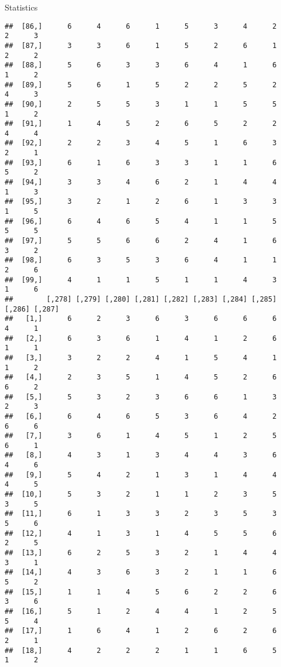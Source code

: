 \documentclass[
  ignorenonframetext,
]{beamer}
\begin{document}
\begin{frame}[fragile]{Statistics}
\begin{verbatim}
##  [86,]      6      4      6      1      5      3      4      2      2      3
##  [87,]      3      3      6      1      5      2      6      1      2      2
##  [88,]      5      6      3      3      6      4      1      6      1      2
##  [89,]      5      6      1      5      2      2      5      2      4      3
##  [90,]      2      5      5      3      1      1      5      5      1      2
##  [91,]      1      4      5      2      6      5      2      2      4      4
##  [92,]      2      2      3      4      5      1      6      3      2      1
##  [93,]      6      1      6      3      3      1      1      6      5      2
##  [94,]      3      3      4      6      2      1      4      4      1      3
##  [95,]      3      2      1      2      6      1      3      3      1      5
##  [96,]      6      4      6      5      4      1      1      5      5      5
##  [97,]      5      5      6      6      2      4      1      6      3      2
##  [98,]      6      3      5      3      6      4      1      1      2      6
##  [99,]      4      1      1      5      1      1      4      3      1      6
##        [,278] [,279] [,280] [,281] [,282] [,283] [,284] [,285] [,286] [,287]
##   [1,]      6      2      3      6      3      6      6      6      4      1
##   [2,]      6      3      6      1      4      1      2      6      1      1
##   [3,]      3      2      2      4      1      5      4      1      1      2
##   [4,]      2      3      5      1      4      5      2      6      6      2
##   [5,]      5      3      2      3      6      6      1      3      2      3
##   [6,]      6      4      6      5      3      6      4      2      6      6
##   [7,]      3      6      1      4      5      1      2      5      6      1
##   [8,]      4      3      1      3      4      4      3      6      4      6
##   [9,]      5      4      2      1      3      1      4      4      4      5
##  [10,]      5      3      2      1      1      2      3      5      3      5
##  [11,]      6      1      3      3      2      3      5      3      5      6
##  [12,]      4      1      3      1      4      5      5      6      2      5
##  [13,]      6      2      5      3      2      1      4      4      3      1
##  [14,]      4      3      6      3      2      1      1      6      5      2
##  [15,]      1      1      4      5      6      2      2      6      3      6
##  [16,]      5      1      2      4      4      1      2      5      5      4
##  [17,]      1      6      4      1      2      6      2      6      2      1
##  [18,]      4      2      2      2      1      1      6      5      1      2

\end{verbatim}
\end{frame}
\end{document}
